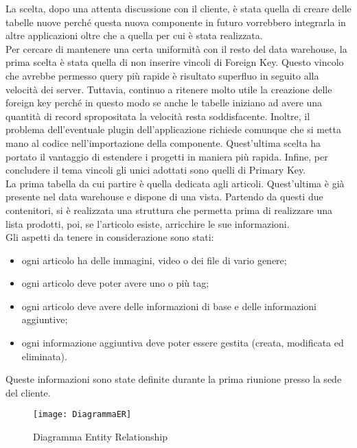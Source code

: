 La scelta, dopo una attenta discussione con il cliente, è stata quella di creare delle tabelle nuove perché questa nuova componente in futuro vorrebbero integrarla in altre applicazioni oltre che a quella per cui è stata realizzata.\\
Per cercare di mantenere una certa uniformità con il resto del data warehouse, la prima scelta è stata quella di non inserire vincoli di Foreign Key.
Questo vincolo che avrebbe permesso query più rapide è risultato superfluo in seguito alla velocità dei server. Tuttavia, continuo a ritenere molto utile la creazione delle foreign key perché in questo modo se anche le tabelle iniziano ad avere una quantità di record spropositata la velocità resta soddisfacente. Inoltre, il problema dell'eventuale plugin dell'applicazione richiede comunque che si metta mano al codice nell'importazione della componente. 
Quest'ultima scelta ha portato il vantaggio di estendere i progetti in maniera più rapida.
Infine, per concludere il tema vincoli gli unici adottati sono quelli di Primary Key.
\\

La prima tabella da cui partire è quella dedicata agli articoli. Quest'ultima è già presente nel data warehouse e dispone di una vista. Partendo da questi due contenitori, si è realizzata una struttura che permetta prima di realizzare una lista prodotti, poi, se l'articolo esiste, arricchire le sue informazioni.\\

Gli aspetti da tenere in considerazione sono stati:
\begin{itemize}
	\item ogni articolo ha delle immagini, video o dei file di vario genere;
	\item ogni articolo deve poter avere uno o più tag;
	\item ogni articolo deve avere delle informazioni di base e delle informazioni aggiuntive;
	\item ogni informazione aggiuntiva deve poter essere gestita (creata, modificata ed eliminata).
\end{itemize}
Queste informazioni sono state definite durante la prima riunione presso la sede del cliente.\\

\begin{figure}[!h] 
	\centering 
	\texttt{[image: DiagrammaER]} 
	\caption{Diagramma Entity Relationship}
	\label{DiagrammaER}
\end{figure}

